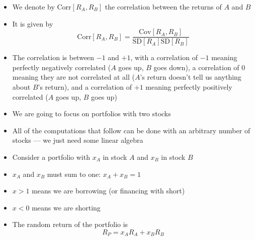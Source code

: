 \documentclass{beamer}
\begin{document}
\begin{frame}{}
	\begin{itemize}
		\item We denote by $\text{Corr}[R_{A},R_{B}]$ the correlation between the returns of $A$ and $B$
		\item It is given by
			\begin{equation*}
				\text{Corr}[R_{A},R_{B}]=\frac{\text{Cov}[R_{A},R_{B}]}{\text{SD}[R_{A}]\text{SD}[R_{B}]}
			\end{equation*}
		\item The correlation is between $-1$ and $+1$, with a correlation of $-1$ meaning perfectly negatively correlated ($A$ goes up, $B$ goes down), a correlation of $0$ meaning they are not correlated at all ($A$'s return doesn't tell us anything about $B$'s return), and a correlation of $+1$ meaning perfectly positively correlated ($A$ goes up, $B$ goes up) 
	\end{itemize}
\end{frame}

\begin{frame}{}
	\begin{itemize}
		\item We are going to focus on portfolios with two stocks
		\item All of the computations that follow can be done with an arbitrary number of stocks --- we just need some linear algebra 	
		\item Consider a portfolio with $x_{A}$ in stock $A$ and $x_{B}$ in stock $B$
		\item $x_{A}$ and $x_{B}$ must sum to one: $x_{A}+x_{B}=1$
		\item $x>1$ means we are borrowing (or financing with short)
		\item $x<0$ means we are shorting
		\item The random return of the portfolio is
		\begin{equation*}
			R_{P}=x_{A}R_{A}+x_{B}R_{B}
		\end{equation*}
	\end{itemize}
\end{frame}
\end{document}
